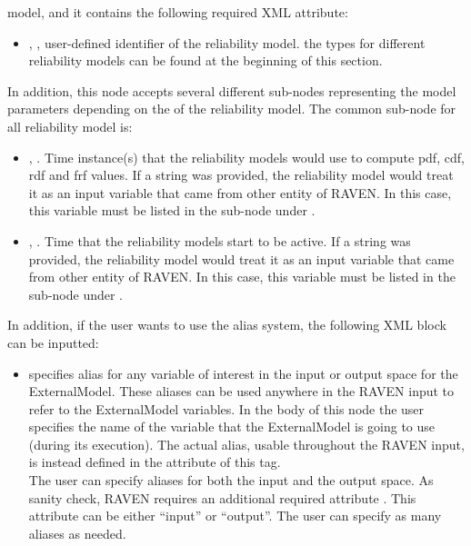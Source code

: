\begin{itemize}
	model, and it contains the following required XML attribute:
	\begin{itemize}
		\item {}, , user-defined identifier of the reliability model.
		\nb the types for different reliability models can be found at the beginning of this section.
	\end{itemize}
	In addition, this node accepts several different sub-nodes representing the model parameters depending on the
	 of the reliability model. The common sub-node for all reliability model is:
	\begin{itemize}
		\item {}, . Time instance(s)
		that the reliability models would use to compute pdf, cdf, rdf and frf values. If a string was provided,
		the reliability model would treat it as an input variable that came from other entity of RAVEN. In this
		case, this variable must be listed in the sub-node  under .
		\item {}, . Time that the reliability models start to be active.
		If a string was provided, the reliability model would treat it as an input variable that came
		from other entity of RAVEN. In this case, this variable must be listed in the sub-node 
		under .
	\end{itemize}
\end{itemize}
In addition, if the user wants to use the alias system, the following XML block can be inputted:
\begin{itemize}
	\item {}  specifies alias for
	any variable of interest in the input or output space for the ExternalModel.
	These aliases can be used anywhere in the RAVEN input to refer to the ExternalModel
	variables.
	In the body of this node the user specifies the name of the variable that the ExternalModel is
	going to use (during its execution).
	The actual alias, usable throughout the RAVEN input, is instead defined in the
	 attribute of this tag.
	\\The user can specify aliases for both the input and the output space. As sanity check, RAVEN
	requires an additional required attribute . This attribute can be either ``input'' or ``output''.
	\nb The user can specify as many aliases as needed.
\end{itemize}

